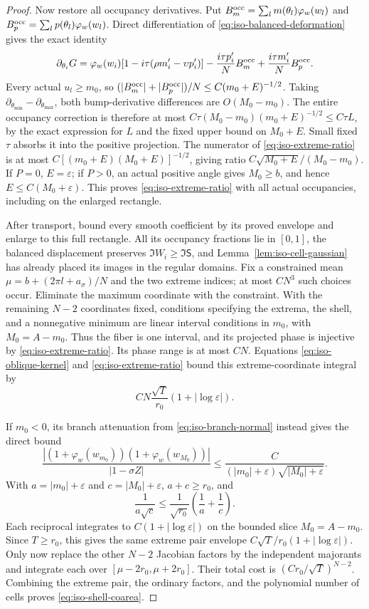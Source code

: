 \documentclass[11pt]{article}
\numberwithin{equation}{section}
\theoremstyle{definition}
\newcommand{\eps}{\varepsilon}
\begin{document}
\begin{proof}
Now restore all occupancy derivatives.  Put
$B_m^{\rm occ}=\sum_lm(\theta_l)\varphi_w(w_l)$ and
$B_p^{\rm occ}=\sum_lp(\theta_l)\varphi_w(w_l)$.
Direct differentiation of \eqref{eq:iso-balanced-deformation} gives
the exact identity
\begin{equation}\label{eq:iso-occupancy-derivative}
 \partial_{\theta_i}G
 =\varphi_w(w_i)[1-i\tau(\rho m'_i-\upsilon p'_i)]
       -\frac{i\tau p'_i}{N}B_m^{\rm occ}
       +\frac{i\tau m'_i}{N}B_p^{\rm occ}.
\end{equation}
Every actual $u_l\ge m_0$, so
$(|B_m^{\rm occ}|+|B_p^{\rm occ}|)/N\le C(m_0+E)^{-1/2}$.
Taking $\partial_{\theta_{\min}}-\partial_{\theta_{\max}}$,
both bump-derivative differences are $O(M_0-m_0)$.
The entire occupancy correction is therefore at most
$C\tau(M_0-m_0)(m_0+E)^{-1/2}\le C\tau L$, by the exact
expression for $L$ and the fixed upper bound on $M_0+E$.
Small fixed $\tau$ absorbs it into the positive projection.
The numerator of \eqref{eq:iso-extreme-ratio} is at most
$C[(m_0+E)(M_0+E)]^{-1/2}$, giving ratio
$C\sqrt{M_0+E}/(M_0-m_0)$.  If $P=0$, $E=\eps$; if $P>0$,
an actual positive angle gives $M_0\ge b$, and hence
$E\le C(M_0+\eps)$.  This proves \eqref{eq:iso-extreme-ratio}
with all actual occupancies, including on the enlarged rectangle.

After transport, bound every smooth coefficient by its proved
envelope and enlarge to this full rectangle.  All its occupancy
fractions lie in $[0,1]$, the balanced displacement preserves
$\Im W_i\ge\Im\mathsf S$, and Lemma~\ref{lem:iso-cell-gaussian}
has already placed its images in the regular domains.
Fix a constrained mean $\mu=b+(2\pi l+a_\sigma)/N$ and the two
extreme indices; at most $CN^3$ such choices occur.  Eliminate the
maximum coordinate with the constraint.  With the remaining $N-2$
coordinates fixed, conditions specifying the extrema, the shell,
and a nonnegative minimum are linear interval conditions in $m_0$,
with $M_0=A-m_0$.  Thus the fiber is one interval, and its projected
phase is injective by \eqref{eq:iso-extreme-ratio}.  Its phase range
is at most $CN$.  Equations \eqref{eq:iso-oblique-kernel} and
\eqref{eq:iso-extreme-ratio} bound this extreme-coordinate integral by
\[
 CN\frac{\sqrt T}{r_0}(1+|\log\eps|).
\]

If $m_0<0$, its branch attenuation from
\eqref{eq:iso-branch-normal} instead gives the direct bound
\[
 \frac{|(1+\varphi_w(w_{m_0}))(1+\varphi_w(w_{M_0}))|}
      {|1-\sigma Z|}
 \le\frac{C}{(|m_0|+\eps)\sqrt{|M_0|+\eps}}.
\]
With $a=|m_0|+\eps$ and $c=|M_0|+\eps$, $a+c\ge r_0$, and
\[
 \frac1{a\sqrt c}\le\frac1{\sqrt{r_0}}\left(\frac1a+\frac1c\right).
\]
Each reciprocal integrates to $C(1+|\log\eps|)$ on the bounded
slice $M_0=A-m_0$.  Since $T\ge r_0$, this gives the same extreme
pair envelope $C\sqrt T/r_0(1+|\log\eps|)$.
Only now replace the other $N-2$ Jacobian factors by the independent
majorants and integrate each over $[\mu-2r_0,\mu+2r_0]$.
Their total cost is $(Cr_0/\sqrt T)^{N-2}$.
Combining the extreme pair, the ordinary factors, and the polynomial
number of cells proves \eqref{eq:iso-shell-coarea}.
\end{proof}
\end{document}
